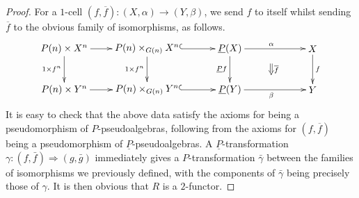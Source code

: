 \begin{proof}
For a $1$-cell $(f,\overline{f}) \colon (X, \alpha) \rightarrow (Y, \beta)$, we send $f$ to itself whilst sending $\overline{f}$ to the obvious family of isomorphisms, as follows.
    \[
        \xy
            (-30,0)*+{P(n) \times X^n}="-10";
            (-30,-15)*+{P(n) \times Y^n}="-11";
            (0,0)*+{P(n) \times_{G(n)} X^n}="00";
            (30,0)*+{\underline{P}(X)}="10";
            (60,0)*+{X}="20";
            (0,-15)*+{P(n) \times_{G(n)} Y^n}="01";
            (30,-15)*+{\underline{P}(Y)}="11";
            (60,-15)*+{Y}="21";
            {\ar@{^{(}->} "00" ; "10"};
            {\ar^{\alpha} "10" ; "20"};
            {\ar_{1 \times f^n} "00" ; "01"};
            {\ar_{\underline{P}f} "10" ; "11"};
            {\ar^{f} "20" ; "21"};
            {\ar@{^{(}->} "01" ; "11"};
            {\ar_{\beta} "11" ; "21"};
            {\ar "-10" ; "00"};
            {\ar "-11" ; "01"};
            {\ar_{1 \times f^n} "-10" ; "-11"};
            {\ar@{=>}^{\overline{f}} (45,-5.5) ; (45,-9.5)};
        \endxy
    \]
It is easy to check that the above data satisfy the axioms for being a pseudomorphism of $P$-pseudoalgebras, following from the axioms for $(f,\overline{f})$ being a pseudomorphism of $\underline{P}$-pseudoalgebras. A $\underline{P}$-transformation $\gamma \colon (f, \bar{f}) \Rightarrow (g, \bar{g})$ immediately gives a $P$-transformation $\bar{\gamma}$ between the families of isomorphisms we previously defined, with the components of $\bar{\gamma}$ being precisely those of $\gamma$.  It is then obvious that $R$ is a $2$-functor.


\end{proof}
